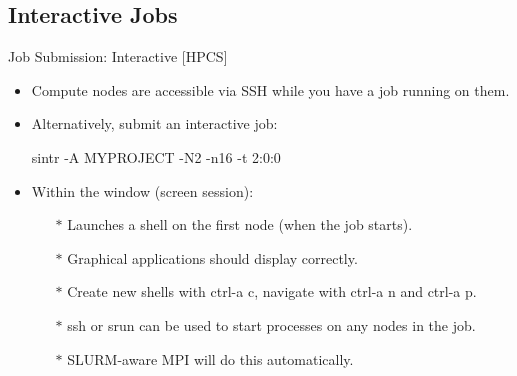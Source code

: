 \subsection{Interactive Jobs}
\begin{frame}[fragile]{Job Submission: Interactive [HPCS]}
\begin{itemize}
\item{Compute nodes are accessible via SSH \alert{while you have a job running on them}.}
\pause
\item{Alternatively, submit an interactive job:}
\begin{semiverbatim}
\alert{sintr -A MYPROJECT -N2 -n16 -t 2:0:0}
\end{semiverbatim}
\medskip
\pause
\item{Within the window (screen session):}
\begin{itemize}
\item[$\ast$]{Launches a shell on the first node (when the job starts).}
\item[$\ast$]{Graphical applications should display correctly.}
\item[$\ast$]{Create new shells with \alert{ctrl-a c}, navigate with \alert{ctrl-a n} and \alert{ctrl-a p}.}
\item[$\ast$]{\alert{ssh} or \alert{srun} can be used to start processes on any nodes in the job.}
\item[$\ast$]{SLURM-aware MPI will do this automatically.}
\end{itemize}
\end{itemize}
\end{frame}


